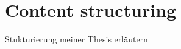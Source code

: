 
 




\section{Content structuring}
\label{section:contentstructuring}
Stukturierung meiner Thesis erläutern